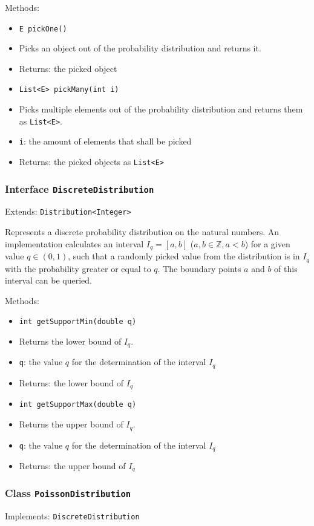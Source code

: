 \documentclass[parskip=full,11pt]{scrartcl}
\begin{document}
Methods:
\begin{itemize}\itemsep -10pt
\item \texttt{E pickOne()}
\item[] Picks an object out of the probability distribution and returns it.
\item[] Returns: the picked object

\item \texttt{List<E> pickMany(int i)}
\item[] Picks multiple elements out of the probability distribution and returns them as \texttt{List<E>}.
\item[] \texttt{i}: the amount of elements that shall be picked
\item[] Returns: the picked objects as \texttt{List<E>}
\end{itemize}

\subsubsection{Interface \texttt{DiscreteDistribution}}
Extends: \texttt{Distribution<Integer>}

Represents a discrete probability distribution on the natural numbers. An implementation calculates an interval \(I_q = [a, b]\) (\(a, b \in \mathbb{Z}, a < b\)) for a given value \(q \in (0,1)\), such that a randomly picked value from the distribution is in \(I_q\) with the probability greater or equal to \(q \). The boundary points \(a\) and \(b\) of this interval can be queried.

Methods:
\begin{itemize}\itemsep -10pt
\item \texttt{int getSupportMin(double q)}
\item[] Returns the lower bound of \(I_q\).
\item[] \texttt{q}: the value \(q\) for the determination of the interval \(I_q\)
\item[] Returns: the lower bound of \(I_q\)

\item \texttt{int getSupportMax(double q)}
\item[] Returns the upper bound of \(I_q\).
\item[] \texttt{q}: the value \(q\) for the determination of the interval \(I_q\)
\item[] Returns: the upper bound of \(I_q\)
\end{itemize}

\subsubsection{Class \texttt{PoissonDistribution}}
Implements: \texttt{DiscreteDistribution}
\end{document}
